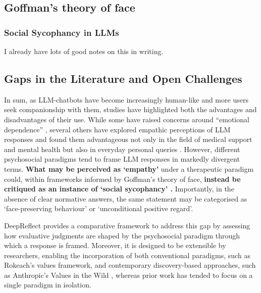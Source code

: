 
\subsection{Goffman's theory of face}
\textcolor{black!30}{\lipsum[9-10]}
\subsubsection{Social Sycophancy in LLMs}
\textcolor{black!30}{I already have lots of good notes on this in writing.}
\textcolor{black!30}{\lipsum[12-14]}

\subsection{Gaps in the Literature and Open Challenges}
In sum, as LLM-chatbots have become increasingly human-like and more users seek companionship with them, studies have highlighted both the advantages and disadvantages of their use. While some have raised concerns around “emotional dependence” \cite{fang-etal-psychoeffects}, several others have explored empathic perceptions of LLM responses and found them advantageous not only in the field of medical support and mental health but also in everyday personal queries \cite{Lee-etal-Empathic}.
However, different psychosocial paradigms tend to frame LLM responses in markedly divergent terms. \textbf{What may be perceived as ‘empathy’} under a therapeutic paradigm could, within frameworks informed by Goffman’s theory of face, \textbf{instead be critiqued as an instance of ‘social sycophancy’ \cite{cheng-etal-sycophancy}.} 
Importantly, in the absence of clear normative answers, the same statement may be categorised as ‘face-preserving behaviour’ or ‘unconditional positive regard’. 

\medskip DeepReflect provides a comparative framework to address this gap by assessing how evaluative judgments are shaped by the psychosocial paradigm through which a response is framed. 
Moreover, it is designed to be extensible by researchers, enabling the incorporation of both conventional paradigms, such as Rokeach’s values framework, and contemporary discovery-based approaches, such as Anthropic’s Values in the Wild \cite{values-in-wild}, whereas prior work has tended to focus on a single paradigm in isolation.

